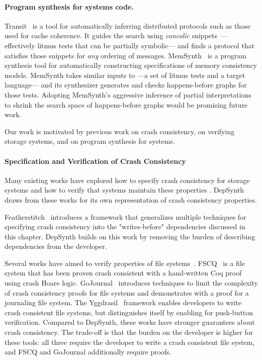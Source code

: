 \paragraph{Program synthesis for systems code.}
Transit~\cite{udupa:transit} is a tool for automatically inferring distributed protocols
such as those used for cache coherence.
It guides the search using \emph{concolic} snippets~\cite{sen:concolic}---%
effectively litmus tests that can be partially symbolic---%
and finds a protocol that satisfies those snippets for \emph{any} ordering of messages.
MemSynth~\cite{bornholt:memsynth} is a program synthesis tool for
automatically constructing specifications of memory consistency models.
MemSynth takes similar inputs to \depsynth---a set of litmus tests and a target language---%
and its synthesizer generates and checks happens-before graphs for those tests.
Adopting MemSynth's aggressive inference of partial interpretations~\cite{torlak:kodkod}
to shrink the search space of happens-before graphs would be promising future work.\tighten
\vspace*{-1em}


Our work is motivated by previous work on crash consistency,
on verifying storage systems, and on program synthesis for systems.

\paragraph{Specification and Verification of Crash Consistency}
Many existing works have explored how to specify crash consistency
for storage systems and how to verify that systems maintain
these properties .
DepSynth draws from these works for its own
representation of crash consistency properties.

Featherstitch~ \cite{frost:featherstitch} introduces a framework that generalizes 
multiple techniques for specifying crash consistency into the
"writes-before" dependencies discussed in this chapter.
DepSynth builds on this work by removing the burden of describing
dependencies from the developer.

Several works have aimed to verify properties of file
systems~\cite{amani:cogent,schellhorn:flashix}.
FSCQ~\cite{chen:fscq} is a file system that has been proven crash consistent
with a hand-written Coq proof using crash Hoare logic.
GoJournal~\cite{chajed:go-journal} introduces techniques to limit the complexity of
crash consistency proofs for file systems
and demonstrates with a proof for a journaling file system.
The Yggdrasil~\cite{sigurbjarnarson:yggdrasil} framework enables developers to write crash consistent
file systems, but distinguishes itself by enabling for push-button
verification. Compared to DepSynth, these works have stronger guarantees
about crash consistency.
The trade-off is that the burden on the developer is higher for these tools:
all three require the developer to write a crash consistent file system,
and FSCQ and GoJournal additionally require proofs.

